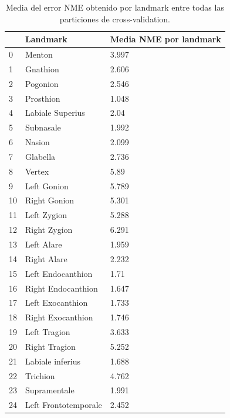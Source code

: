         \begin{table}[!ht]
            \centering
            \caption{Media del error NME obtenido por landmark entre todas las particiones de cross-validation.}
            \begin{tabular}{|l|l|l|}
            \hline
                ~ & Landmark & Media NME por landmark \\ \hline
                0 & Menton & 3.997 \\ \hline
                1 & Gnathion & 2.606 \\ \hline
                2 & Pogonion & 2.546 \\ \hline
                3 & Prosthion & 1.048 \\ \hline
                4 & Labiale Superius & 2.04 \\ \hline
                5 & Subnasale & 1.992 \\ \hline
                6 & Nasion & 2.099 \\ \hline
                7 & Glabella & 2.736 \\ \hline
                8 & Vertex & 5.89 \\ \hline
                9 & Left Gonion & 5.789 \\ \hline
                10 & Right Gonion & 5.301 \\ \hline
                11 & Left Zygion & 5.288 \\ \hline
                12 & Right Zygion & 6.291 \\ \hline
                13 & Left Alare & 1.959 \\ \hline
                14 & Right Alare & 2.232 \\ \hline
                15 & Left Endocanthion & 1.71 \\ \hline
                16 & Right Endocanthion & 1.647 \\ \hline
                17 & Left Exocanthion & 1.733 \\ \hline
                18 & Right Exocanthion & 1.746 \\ \hline
                19 & Left Tragion & 3.633 \\ \hline
                20 & Right Tragion & 5.252 \\ \hline
                21 & Labiale inferius & 1.688 \\ \hline
                22 & Trichion & 4.762 \\ \hline
                23 & Supramentale & 1.991 \\ \hline
                24 & Left Frontotemporale & 2.452 \\ \hline

\end{tabular}
\end{table}
